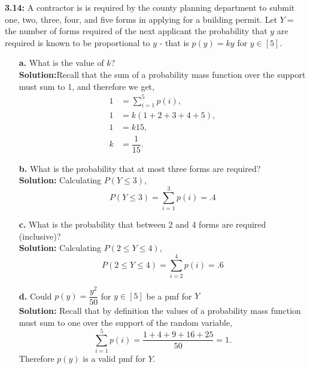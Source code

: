 \documentclass[12pt]{article}
\theoremstyle{homework}
\begin{document}
\textbf{3.14:} A contractor is is required by the county planning department to submit one, two, three, four, and five forms in applying for a building permit.
Let $Y =$ the number of forms required of the next applicant the probability that $y$ are required is known to be proportional to $y$ - that is $p(y) = ky$ for $y \in [5]$.\\
\begin{enumerate}
  \item[\textbf{a.}] What is the value of $k$?\\
   
  \textbf{Solution:}Recall that the sum of a probability mass function over the support must sum to 1, and therefore we get,
  \begin{align*}
    1 &= \sum_{i = 1}^5 p(i),\\ 
    1 &= k(1+2+3+4+5),\\ 
    1&= k15,\\
    k &= \dfrac{1}{15}. 
  \end{align*}
  \vspace{.5in}



  \item[\textbf{b.}]What is the probability that at most three forms are required?\\
  
  \textbf{Solution:} Calculating $P(Y \le 3)$,
  \begin{equation*}
    P(Y \le 3) =  \sum_{i = 1}^3 p(i) = .4
  \end{equation*}
  \vspace{.5in}


  \item[\textbf{c.}] What is the probability that between 2 and 4 forms are required (inclusive)?\\
   
  \textbf{Solution:} Calculating $P(2 \le Y \le 4)$,
  \begin{equation*}
    P(2\le Y \le 4) =  \sum_{i = 2}^4 p(i) = .6
  \end{equation*}
  \vspace{.5in}


  \item[\textbf{d.}] Could $p(y) = \dfrac{y^2}{50}$ for  $y \in [5]$ be a pmf for $Y$\\
   
  \textbf{Solution:} Recall that by definition the values of a probability mass function must sum to one over the support of the random variable,
  \begin{equation*}
    \sum_{i = 1}^5 p(i) = \dfrac{1+4+9+16+25}{50} = 1.
  \end{equation*}
  Therefore $p(y)$ is a valid pmf for $Y$. 
\end{enumerate}
\end{document}
